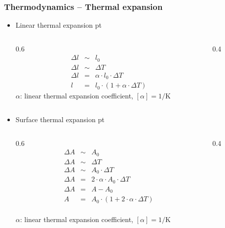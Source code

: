 \documentclass[t,aspectratio=169]{beamer}
\begin{document}
\begin{frame}
\frametitle{Thermodynamics -- Thermal expansion}
\begin{itemize}
\item Linear thermal expansion
 pt
\begin{columns}
\begin{column}{0.6\textwidth}
\begin{eqnarray*}
\Delta l & \sim & l_0 \\
\Delta l & \sim & \Delta T  \\
\Delta l & = & \alpha \cdot l_0 \cdot \Delta T \\
l & = & l_0 \cdot (1 + \alpha \cdot \Delta T)
\end{eqnarray*}
$\alpha$: linear thermal expansion coefficient, $[\alpha] = 1/\text{K}$
\end{column}
\begin{column}{0.4\textwidth}
\vfill  
{}
\end{column}
\end{columns}

\pagebreak
\item Surface thermal expansion
 pt
\begin{columns}
\begin{column}{0.6\textwidth}
\begin{eqnarray*}
\Delta A & \sim & A_0 \\
  \Delta A & \sim & \Delta T \\
  \Delta A & \sim & A_{0} \cdot \Delta T \\
  \Delta A & = & 2 \cdot \alpha \cdot A_0 \cdot \Delta T  \\
\Delta A & = & A - A_{0} \\
A & = & A_0 \cdot (1 + 2 \cdot \alpha \cdot \Delta T)
\end{eqnarray*}\\
$\alpha$: linear thermal expansion coefficient, $[\alpha] = 1/\text{K}$
\end{column}
\begin{column}{0.4\textwidth}
\vfill
{}
\end{column}
\end{columns}
\end{itemize}
\end{frame}
\end{document}

